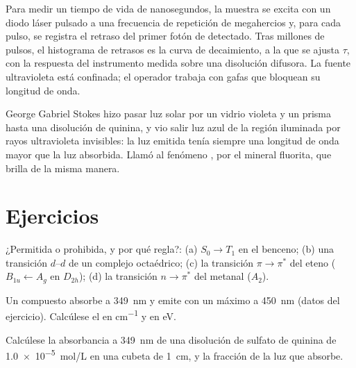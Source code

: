 \begin{inthelab}
Para medir un tiempo de vida de nanosegundos, la muestra se excita con un diodo láser
pulsado a una frecuencia de repetición de megahercios y, para cada pulso, se registra el retraso del
primer fotón de  detectado. Tras millones de pulsos, el
histograma de retrasos es la curva de decaimiento, a la que se ajusta $\tau$, con la
respuesta del instrumento medida sobre una disolución difusora. La fuente
ultravioleta está confinada; el operador trabaja con gafas que bloquean su
longitud de onda.
\end{inthelab}

\begin{history}[Stokes, 1852]
George Gabriel Stokes hizo pasar luz solar por un vidrio violeta y un prisma
hasta una disolución de quinina, y vio salir luz azul de la región iluminada por
rayos ultravioleta invisibles: la luz emitida tenía siempre una longitud de onda mayor
que la luz absorbida. Llamó al fenómeno , por el
mineral fluorita, que brilla de la misma manera.
\end{history}

\section{Ejercicios}

\begin{exercise}[$\star$]\label{exo:b3:electronic-spectroscopy:1}
¿Permitida o prohibida, y por qué regla?: (a) $S_0 \to T_1$ en el benceno; (b) una transición
$d$--$d$ de un complejo octaédrico; (c) la transición $\pi\to\pi^*$ del eteno
($B_{1u} \leftarrow A_g$ en $D_{2h}$); (d) la transición $n\to\pi^*$ del metanal
($A_2$).
\end{exercise}

\begin{exercise}[$\star$]\label{exo:b3:electronic-spectroscopy:2}
Un compuesto absorbe a \qty{349}{nm} y emite  con un máximo a
\qty{450}{nm} (datos del ejercicio). Calcúlese el  en \unit{cm^{-1}} y en
eV.
\end{exercise}

\begin{exercise}[$\star$]\label{exo:b3:electronic-spectroscopy:3}
Calcúlese la absorbancia a \qty{349}{nm} de una disolución de sulfato de quinina de \qty{1.0e-5}{mol/L}
en una cubeta de \qty{1}{cm}, y la fracción de la luz que absorbe.
\end{exercise}

